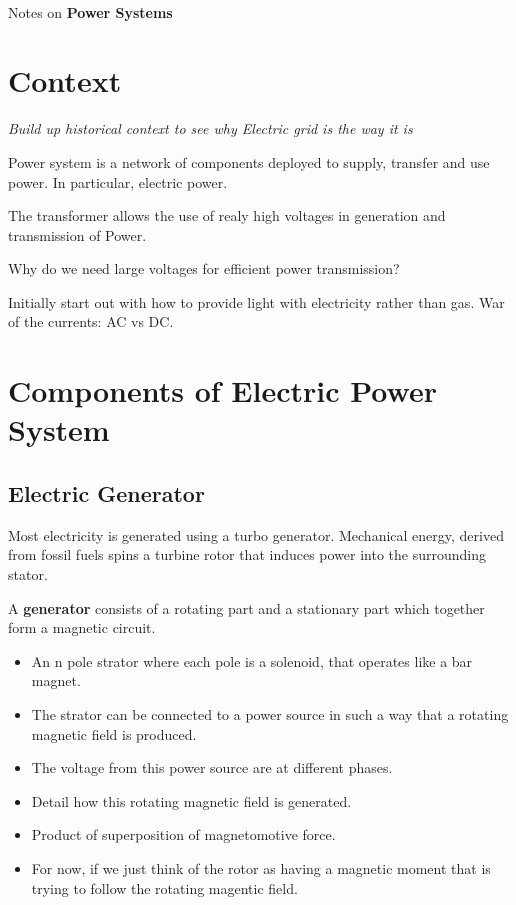 \documentclass[11pt]{article}
\begin{document}
\thispagestyle{empty}
\bigskip \
\vspace{0.1cm}

\begin{center}
{\fontsize{22}{22} \selectfont Notes on}
\vskip 16pt
{\fontsize{36}{36} \selectfont \bf \sffamily Power Systems}
\vskip 24pt
\end{center}


\newpage
\microtoc
\newpage


\section{Context}


\textit{Build up historical context to see why Electric grid is the way it is}

Power system is a network of components deployed to supply, transfer and use
power. In particular, electric power.

The transformer allows the use of realy high voltages in generation and
transmission of Power.

Why do we need large voltages for efficient power transmission?


Initially start out with how to provide light with electricity rather than gas.
War of the currents: AC vs DC.

\section{Components of Electric Power System}

\subsection{Electric Generator}

Most electricity is generated using a turbo generator. Mechanical energy,
derived from fossil fuels spins a turbine rotor that induces power into the
surrounding stator.

A \textbf{generator} consists of a rotating part and a stationary part which
together form a magnetic circuit.

\begin{itemize}
    \item An n pole strator where each pole is a solenoid, that operates like a
        bar magnet.
    \item The strator can be connected to a power source in such a way that a
        rotating magnetic field is produced.
    \item The voltage from this power source are at different phases.
    \item Detail how this rotating magnetic field is generated.
    \item Product of superposition of magnetomotive force.

    \item For now, if we just think of the rotor as having a magnetic moment
        that is trying to follow the rotating magentic field.
\end{itemize}
\end{document}
